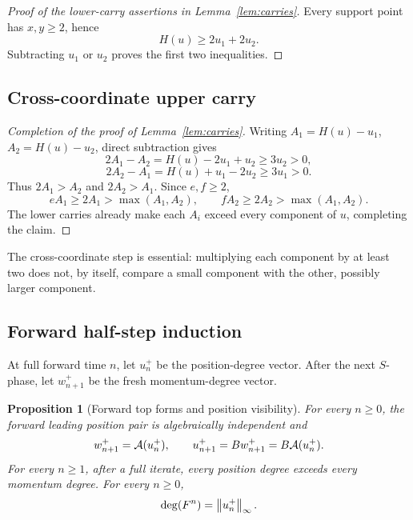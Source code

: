 \documentclass[11pt]{article}
\newtheorem{proposition}[theorem]{Proposition}
\theoremstyle{definition}
\theoremstyle{remark}
\begin{document}
\begin{proof}[Proof of the lower-carry assertions in
Lemma~\ref{lem:carries}]
Every support point has \(x,y\geq2\), hence
\[
H(u)\geq2u_1+2u_2.
\]
Subtracting \(u_1\) or \(u_2\) proves the first two inequalities.
\end{proof}

\subsection{Cross-coordinate upper carry}

\begin{proof}[Completion of the proof of Lemma~\ref{lem:carries}]
Writing \(A_1=H(u)-u_1\), \(A_2=H(u)-u_2\), direct subtraction gives
\[
2A_1-A_2=H(u)-2u_1+u_2\geq3u_2>0,
\]
\[
2A_2-A_1=H(u)+u_1-2u_2\geq3u_1>0.
\]
Thus \(2A_1>A_2\) and \(2A_2>A_1\).  Since \(e,f\geq2\),
\[
eA_1\geq2A_1>\max(A_1,A_2),\qquad
fA_2\geq2A_2>\max(A_1,A_2).
\]
The lower carries already make each \(A_i\) exceed every component of
\(u\), completing the claim.
\end{proof}

The cross-coordinate step is essential: multiplying each component by at
least two does not, by itself, compare a small component with the other,
possibly larger component.

\subsection{Forward half-step induction}

At full forward time \(n\), let \(u_n^+\) be the position-degree vector.
After the next \(S\)-phase, let \(w_{n+1}^+\) be the fresh
momentum-degree vector.

\begin{proposition}[Forward top forms and position visibility]
\label{prop:forward}
For every \(n\geq0\), the forward leading position pair is algebraically
independent and
\[
w^+_{n+1}=\mathcal{A}(u^+_n),\qquad
u^+_{n+1}=Bw^+_{n+1}=B\mathcal{A}(u^+_n).
\]
For every \(n\geq1\), after a full iterate, every position degree exceeds
every momentum degree.  For every \(n\geq0\),
\[
\deg(F^n)=\left\lVert u^+_n\right\rVert_{\infty}.
\]
\end{proposition}
\end{document}
